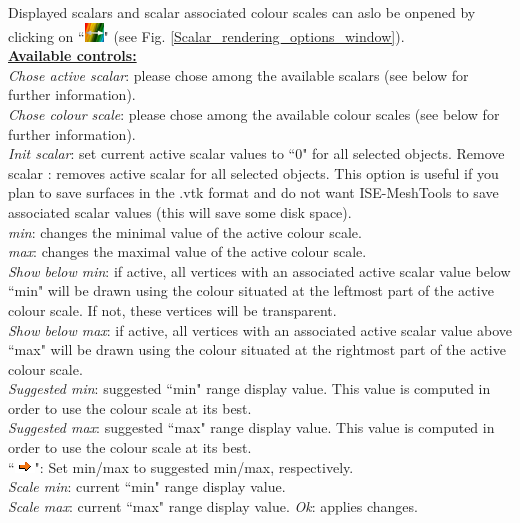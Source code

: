 Displayed scalars and scalar associated
colour scales can aslo be onpened by
clicking on ``\includegraphics[scale=0.7]{images/pixmap/edit_color_scale.png}" (see Fig. \ref{Scalar_rendering_options_window}).\\
\noindent
\textbf{\underline{Available controls:}}\\
\textit{Chose active scalar}: please chose among
the available scalars (see below for further
information).\\
\textit{Chose colour scale}: please chose among
the available colour scales (see below for
further information).\\


\textit{Init scalar}: set current active scalar values to ``0" for all selected objects.
Remove scalar : removes active scalar for all selected objects. This option is useful if you plan to save surfaces in the .vtk format and do not want ISE-MeshTools to save associated scalar values (this will save some disk space).\\
\textit{min}: changes the minimal value of the active colour scale.\\
\textit{max}: changes the maximal value of the active colour scale.\\
\textit{Show below min}: if active, all vertices with an associated active scalar value below ``min" will be drawn using the colour situated at the leftmost part of the active colour scale. If not, these vertices will be transparent.\\
\textit{Show below max}: if active, all vertices with an associated active scalar value above ``max" will be drawn using the colour situated at the rightmost part of the active colour scale.\\
\textit{Suggested min}: suggested ``min" range display value. This value is computed in order to use the
colour scale at its best.\\
\textit{Suggested max}: suggested ``max" range display value. This value is computed in order to use the
colour scale at its best.\\
``\includegraphics[scale=0.7]{images/pixmap/s_right_132.png}": Set min/max to suggested min/max, respectively.\\
\textit{Scale min}: current ``min" range display value.\\
\textit{Scale max}: current ``max" range display value.
\textit{Ok}: applies changes.


